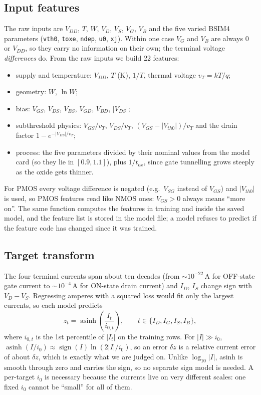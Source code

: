 \subsection{Input features}
The raw inputs are $V_{DD}$, $T$, $W$, $V_D$, $V_S$, $V_G$, $V_B$ and the five varied BSIM4
parameters (\texttt{vth0}, \texttt{toxe}, \texttt{ndep}, \texttt{u0}, \texttt{xj}). Within one
case $V_G$ and $V_B$ are always $0$ or $V_{DD}$, so they carry no information on their own; the
terminal voltage \emph{differences} do. From the raw inputs we build 22 features:
\begin{itemize}
  \item supply and temperature: $V_{DD}$, $T$ (K), $1/T$, thermal voltage $v_T = kT/q$;
  \item geometry: $W$, $\ln W$;
  \item bias: $V_{GS}$, $V_{DS}$, $V_{BS}$, $V_{GD}$, $V_{BD}$, $|V_{DS}|$;
  \item subthreshold physics: $V_{GS}/v_T$, $V_{DS}/v_T$, $(V_{GS}-|V_{th0}|)/v_T$ and the drain
        factor $1-e^{-|V_{DS}|/v_T}$;
  \item process: the five parameters divided by their nominal values from the model card
        (so they lie in $[0.9, 1.1]$), plus $1/t_{ox}$, since gate tunnelling grows steeply as
        the oxide gets thinner.
\end{itemize}
For PMOS every voltage difference is negated (e.g.\ $V_{SG}$ instead of $V_{GS}$) and
$|V_{th0}|$ is used, so PMOS features read like NMOS ones: $V_{GS}>0$ always means ``more on''.
The same function computes the features in training and inside the saved model, and the
feature list is stored in the model file; a model refuses to predict if the feature code
has changed since it was trained.

\subsection{Target transform}
The four terminal currents span about ten decades (from $\sim\!10^{-22}$\,A for OFF-state
gate current to $\sim\!10^{-4}$\,A for ON-state drain current) and $I_D$, $I_S$ change sign
with $V_D-V_S$. Regressing amperes with a squared loss would fit only the largest currents, so
each model predicts
\begin{equation}
  z_t = \operatorname{asinh}\!\left(\frac{I_t}{i_{0,t}}\right),\qquad
  t \in \{I_D, I_G, I_S, I_B\},
\end{equation}
where $i_{0,t}$ is the 1st percentile of $|I_t|$ on the training rows. For $|I|\gg i_0$,
$\operatorname{asinh}(I/i_0)\approx \operatorname{sign}(I)\ln(2|I|/i_0)$, so an error
$\delta z$ is a relative current error of about $\delta z$, which is exactly what we are judged
on. Unlike $\log_{10}|I|$, asinh is smooth through zero and carries the sign, so no separate sign
model is needed. A per-target $i_0$ is necessary because the currents live on very different
scales: one fixed $i_0$ cannot be ``small'' for all of them.

